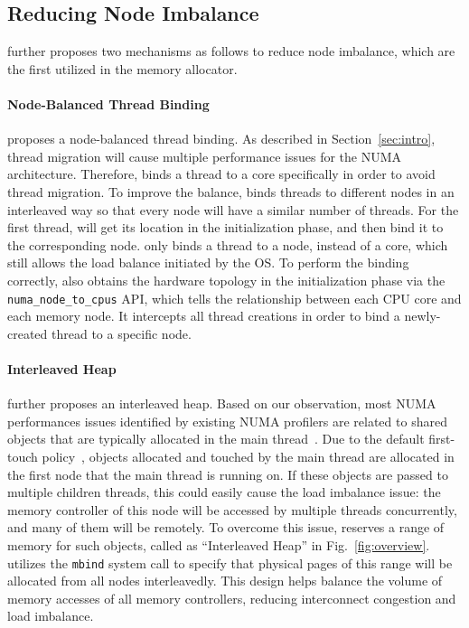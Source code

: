 \subsection{Reducing Node Imbalance}
\label{sec:balance}

\NM{} further proposes two mechanisms as follows to reduce node imbalance, which are the first utilized in the memory allocator. 

\paragraph{Node-Balanced Thread Binding} \NM{} proposes a node-balanced thread binding. As described in Section~\ref{sec:intro}, thread migration will cause multiple performance issues for the NUMA architecture. Therefore, \NM{} binds a thread to a core specifically in order to avoid thread migration. To improve the balance, \NM{} binds threads to different nodes in an interleaved way so that every node will have a similar number of threads. For the first thread, \NM{} will get its location in the initialization phase, and then bind it to the corresponding node. \NM{} only binds a thread to a node, instead of a core, which still allows the load balance initiated by the OS. To perform the binding correctly, \NM{} also obtains the hardware topology in the initialization phase via the \texttt{numa\_node\_to\_cpus} API, which tells the relationship between each CPU core and each memory node. It intercepts all thread creations in order to bind a newly-created thread to a specific node. 

\paragraph{Interleaved Heap} \NA{} further proposes an interleaved heap. Based on our observation, most NUMA performances issues identified by existing NUMA profilers are related to shared objects that are typically allocated in the main thread~\cite{XULIU, MemProf}. Due to the default first-touch policy~\cite{lameter2013numa, diener2015locality}, objects allocated and touched by the main thread are allocated in the first node that the main thread is running on. If these objects are passed to multiple children threads, this could easily cause the load imbalance issue: the memory controller of this node will be accessed by multiple threads concurrently, and many of them will be remotely. To overcome this issue, \NA{} reserves a range of memory for such objects, called as ``Interleaved Heap'' in Fig.~\ref{fig:overview}. \NA{} utilizes the \texttt{mbind} system call to specify that physical pages of this range will be allocated from all nodes interleavedly. This design helps balance the volume of memory accesses of all memory controllers, reducing interconnect congestion and load imbalance. 

